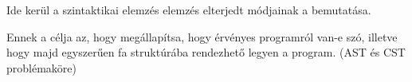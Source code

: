 
Ide kerül a szintaktikai elemzés elemzés elterjedt módjainak a bemutatása.

Ennek a célja az, hogy megállapítsa, hogy érvényes programról van-e szó, illetve hogy majd egyszerűen fa struktúrába rendezhető legyen a program. (AST és CST problémaköre)

